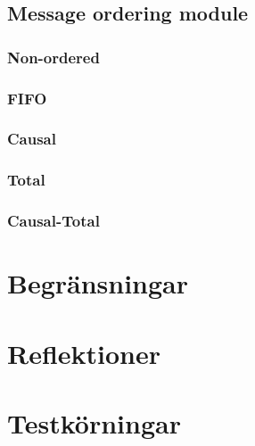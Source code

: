 \documentclass[titlepage, twocolumn, a4paper, 10pt]{article}
\begin{document}
\subsection{Message ordering module}\label{sec:message-ordering-module}
\subsubsection{Non-ordered}\label{sec:-non-ordered}
\subsubsection{FIFO}\label{sec:fifo}
\subsubsection{Causal}\label{sec:causal}
\subsubsection{Total}\label{sec:total}
\subsubsection{Causal-Total}\label{sec:causal-total}


\section{Begränsningar}\label{Begransningar}

\section{Reflektioner}\label{Reflektioner}

\section{Testkörningar}\label{Testkorningar}
\end{document}
